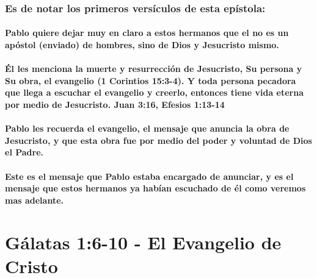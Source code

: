 \documentclass[11a pt,twoside]{article}
\let\oldsection\section
\renewcommand{\section}{\needspace{6\baselineskip}\oldsection}
\let\oldsubsubsection\subsubsection
\renewcommand{\subsubsection}{\needspace{4\baselineskip}\oldsubsubsection}
\let\oldparagraph\paragraph
\renewcommand{\paragraph}{\needspace{3\baselineskip}\oldparagraph}
\begin{document}
\subsubsection{Es de notar los primeros versículos de esta
epístola:}\label{es-de-notar-los-primeros-versuxedculos-de-esta-epuxedstola}

\paragraph{Pablo quiere dejar muy en claro a estos hermanos que el no es
un apóstol (enviado) de hombres, sino de Dios y Jesucristo
mismo.}\label{pablo-quiere-dejar-muy-en-claro-a-estos-hermanos-que-el-no-es-un-apuxf3stol-enviado-de-hombres-sino-de-dios-y-jesucristo-mismo.}

\paragraph{Él les menciona la muerte y resurrección de Jesucristo, Su
persona y Su obra, el evangelio (1 Corintios 15:3-4). Y toda persona
pecadora que llega a escuchar el evangelio y creerlo, entonces tiene
vida eterna por medio de Jesucristo. Juan 3:16, Efesios
1:13-14}\label{uxe9l-les-menciona-la-muerte-y-resurrecciuxf3n-de-jesucristo-su-persona-y-su-obra-el-evangelio-1-corintios-153-4.-y-toda-persona-pecadora-que-llega-a-escuchar-el-evangelio-y-creerlo-entonces-tiene-vida-eterna-por-medio-de-jesucristo.-juan-316-efesios-113-14}

\paragraph{Pablo les recuerda el evangelio, el mensaje que anuncia la
obra de Jesucristo, y que esta obra fue por medio del poder y voluntad
de Dios el
Padre.}\label{pablo-les-recuerda-el-evangelio-el-mensaje-que-anuncia-la-obra-de-jesucristo-y-que-esta-obra-fue-por-medio-del-poder-y-voluntad-de-dios-el-padre.}

\paragraph{Este es el mensaje que Pablo estaba encargado de anunciar, y
es el mensaje que estos hermanos ya habían escuchado de él como veremos
mas
adelante.}\label{este-es-el-mensaje-que-pablo-estaba-encargado-de-anunciar-y-es-el-mensaje-que-estos-hermanos-ya-habuxedan-escuchado-de-uxe9l-como-veremos-mas-adelante.}

\section{Gálatas 1:6-10 - El Evangelio de
Cristo}\label{guxe1latas-16-10---el-evangelio-de-cristo}
\end{document}
